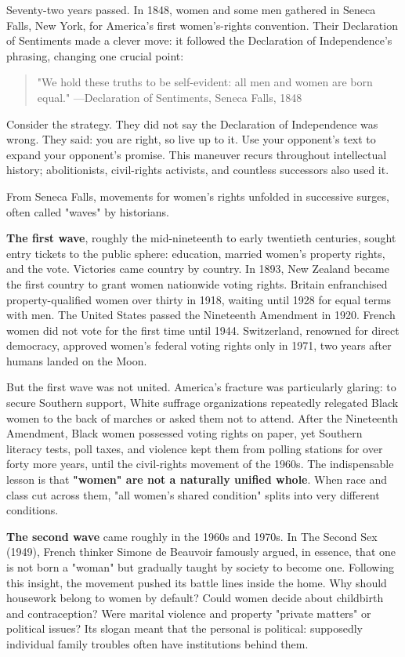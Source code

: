 Seventy-two years passed. In 1848, women and some men gathered in Seneca Falls, New York, for America's first women's-rights convention. Their Declaration of Sentiments made a clever move: it followed the Declaration of Independence's phrasing, changing one crucial point:

\begin{quote}
"We hold these truths to be self-evident: all men and women are born equal." ---Declaration of Sentiments, Seneca Falls, 1848
\end{quote}
Consider the strategy. They did not say the Declaration of Independence was wrong. They said: you are right, so live up to it. Use your opponent's text to expand your opponent's promise. This maneuver recurs throughout intellectual history; abolitionists, civil-rights activists, and countless successors also used it.

From Seneca Falls, movements for women's rights unfolded in successive surges, often called "waves" by historians.

\textbf{The first wave}, roughly the mid-nineteenth to early twentieth centuries, sought entry tickets to the public sphere: education, married women's property rights, and the vote. Victories came country by country. In 1893, New Zealand became the first country to grant women nationwide voting rights. Britain enfranchised property-qualified women over thirty in 1918, waiting until 1928 for equal terms with men. The United States passed the Nineteenth Amendment in 1920. French women did not vote for the first time until 1944. Switzerland, renowned for direct democracy, approved women's federal voting rights only in 1971, two years after humans landed on the Moon.

But the first wave was not united. America's fracture was particularly glaring: to secure Southern support, White suffrage organizations repeatedly relegated Black women to the back of marches or asked them not to attend. After the Nineteenth Amendment, Black women possessed voting rights on paper, yet Southern literacy tests, poll taxes, and violence kept them from polling stations for over forty more years, until the civil-rights movement of the 1960s. The indispensable lesson is that \textbf{"women" are not a naturally unified whole}. When race and class cut across them, "all women's shared condition" splits into very different conditions.

\textbf{The second wave} came roughly in the 1960s and 1970s. In The Second Sex (1949), French thinker Simone de Beauvoir famously argued, in essence, that one is not born a "woman" but gradually taught by society to become one. Following this insight, the movement pushed its battle lines inside the home. Why should housework belong to women by default? Could women decide about childbirth and contraception? Were marital violence and property "private matters" or political issues? Its slogan meant that the personal is political: supposedly individual family troubles often have institutions behind them.

